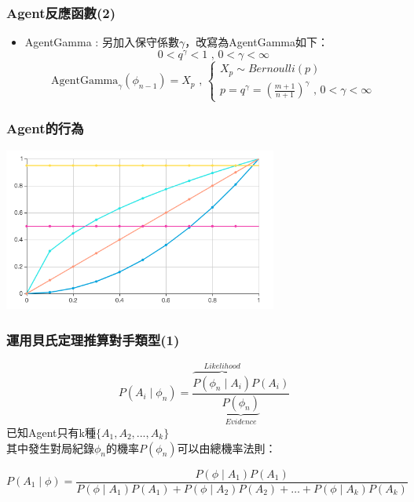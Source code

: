 \documentclass[12pt,a4paper]{beamer}
\begin{document}
\begin{CJK}{UTF8}{bsmi}
\begin{frame}
\begin{itemize}
\end{itemize}

\end{frame}

\begin{frame}
\frametitle{Agent反應函數(2)}

\begin{itemize}

\item AgentGamma : 另加入保守係數$\gamma$，改寫為AgentGamma如下：
$$
0<q^\gamma<1\text{ , }0<\gamma<\infty
$$
$$
\text{AgentGamma}_\gamma(\phi_{n-1})=X_p\text{ , }\begin{cases}
X_p\sim Bernoulli(p) \\
p=q^\gamma=(\frac{m+1}{n+1})^\gamma\text{ , }0<\gamma<\infty
\end{cases}
$$

\end{itemize}

\end{frame}

\begin{frame}
\frametitle{Agent的行為}

\centering\includegraphics[width=90mm,scale=0.7]{behave}

\end{frame}

\begin{frame}
\frametitle{運用貝氏定理推算對手類型(1)}

$$
P(A_i\mid \phi_n) = \frac{\overbrace{P(\phi_n \mid A_i)}^{Likelihood}P(A_i)}{\underbrace{P(\phi_n)}_{Evidence}}
$$
已知Agent只有k種$\{A_1,A_2,...,A_k\}$ \\
其中發生對局紀錄$\phi_n$的機率$P(\phi_n)$可以由總機率法則：
\begin{small}
\[
P(A_1\mid \phi) = \frac{P(\phi \mid A_1)P(A_1)}{P(\phi\mid A_1)P(A_1)+P(\phi\mid A_2)P(A_2)+\dots+P(\phi\mid A_k)P(A_k)}
\]
\end{small}
\end{frame}


\end{CJK}
\end{document}
